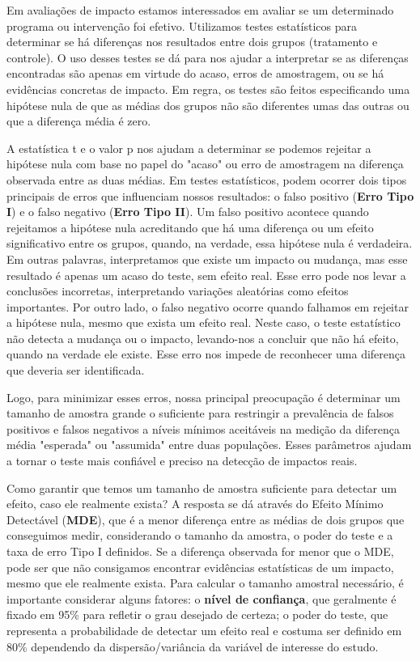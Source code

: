 Em avaliações de impacto estamos interessados em avaliar se um determinado programa ou intervenção foi efetivo. Utilizamos testes estatísticos para determinar se há diferenças nos resultados entre dois grupos (tratamento e controle). O uso desses testes se dá para nos ajudar a interpretar se as diferenças encontradas são apenas em virtude do acaso, erros de amostragem, ou se há evidências concretas de impacto. Em regra, os testes são feitos especificando uma hipótese nula de que as médias dos grupos não são diferentes umas das outras ou que a diferença média é zero.

A estatística t e o valor p nos ajudam a determinar se podemos rejeitar a hipótese nula com base no papel do "acaso" ou erro de amostragem na diferença observada entre as duas médias. Em testes estatísticos, podem ocorrer dois tipos principais de erros que influenciam nossos resultados: o falso positivo (\textbf{Erro Tipo I}) e o falso negativo (\textbf{Erro Tipo II}). Um falso positivo acontece quando rejeitamos a hipótese nula acreditando que há uma diferença ou um efeito significativo entre os grupos, quando, na verdade, essa hipótese nula é verdadeira. Em outras palavras, interpretamos que existe um impacto ou mudança, mas esse resultado é apenas um acaso do teste, sem efeito real. Esse erro pode nos levar a conclusões incorretas, interpretando variações aleatórias como efeitos importantes. Por outro lado, o falso negativo ocorre quando falhamos em rejeitar a hipótese nula, mesmo que exista um efeito real. Neste caso, o teste estatístico não detecta a mudança ou o impacto, levando-nos a concluir que não há efeito, quando na verdade ele existe. Esse erro nos impede de reconhecer uma diferença que deveria ser identificada.

Logo, para minimizar esses erros, nossa principal preocupação é determinar um tamanho de amostra grande o suficiente para restringir a prevalência de falsos positivos e falsos negativos a níveis mínimos aceitáveis na medição da diferença média "esperada" ou "assumida" entre duas populações. Esses parâmetros ajudam a tornar o teste mais confiável e preciso na detecção de impactos reais.

Como garantir que temos um tamanho de amostra suficiente para detectar um efeito, caso ele realmente exista? A resposta se dá através do Efeito Mínimo Detectável (\textbf{MDE}), que é a menor diferença entre as médias de dois grupos que conseguimos medir, considerando o tamanho da amostra, o poder do teste e a taxa de erro Tipo I definidos. Se a diferença observada for menor que o MDE, pode ser que não consigamos encontrar evidências estatísticas de um impacto, mesmo que ele realmente exista. Para calcular o tamanho amostral necessário, é importante considerar alguns fatores: o \textbf{nível de confiança}, que geralmente é fixado em 95\% para refletir o grau desejado de certeza; o poder do teste, que representa a probabilidade de detectar um efeito real e costuma ser definido em 80\% dependendo da dispersão/variância da variável de interesse do estudo.


